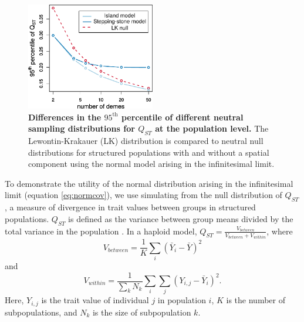 \begin{figure}
  \centering
  \includegraphics[width=0.5\textwidth]{./figures/qst_deme_percentile_nospace_alt.pdf}
  \caption{\textbf{Differences in the $95^{\mathrm{th}}$ percentile of different
      neutral sampling distributions for $Q_{ST}$ at the population level.} The
    Lewontin-Krakauer (LK) distribution is compared to neutral null
    distributions for structured populations with and without a spatial
    component using the normal model arising in the infinitesimal limit.}
  \label{fig:qst_perc}
\end{figure}


To demonstrate the utility of the normal distribution arising in the
infinitesimal limit (equation \ref{eq:normcov}), we use simulating from the null
distribution of $Q_{ST}$, a measure of divergence in trait values between groups
in structured populations. $Q_{ST}$ is defined as the variance between group
means divided by the total variance in the population \citep{Spitze1993}. In a
haploid model, $Q_{ST} = \frac{V_{between}}{V_{between} + V_{within}}$, where
\begin{equation*}
  V_{between} = \frac{1}{K} \sum_i \left( \bar{Y}_i - \bar{Y} \right)^2
\end{equation*}
and
\begin{equation*}
  V_{within} = \frac{1}{\sum_k N_k} \sum_i \sum_j \left( Y_{i,j} - \bar{Y}_i \right)^2.
\end{equation*}
Here, $Y_{i,j}$ is the trait value of individual $j$ in population $i$, $K$ is
the number of subpopulations, and $N_k$ is the size of subpopulation $k$.

